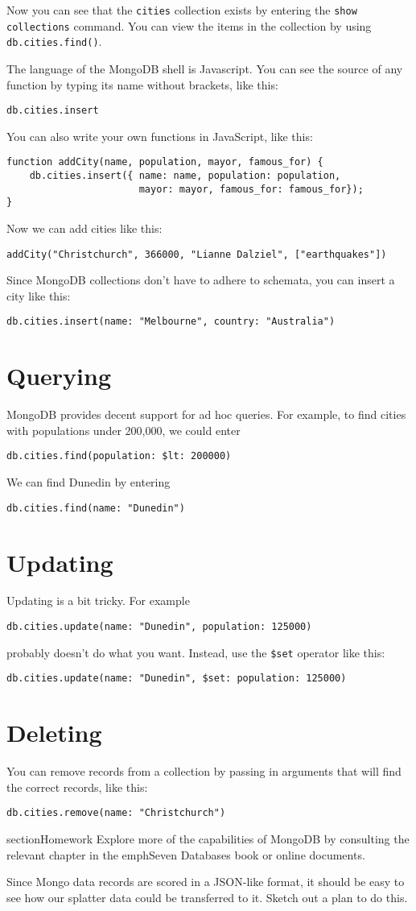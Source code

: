\documentclass{article}
\begin{document}
Now you can see that the \texttt{cities} collection exists by entering the \texttt{show collections} command.  You can view the items in the collection by using \texttt{db.cities.find()}.

The language of the MongoDB shell is Javascript.  You can see the source of any function by typing its name without brackets, like this:

\texttt{db.cities.insert}

You can also write your own functions in JavaScript, like this:

\begin{verbatim}
function addCity(name, population, mayor, famous_for) {
    db.cities.insert({ name: name, population: population, 
                       mayor: mayor, famous_for: famous_for});
}
\end{verbatim}

Now we can add cities like this:

\texttt{addCity("Christchurch", 366000, "Lianne Dalziel", ["earthquakes"]) }

Since MongoDB collections don't have to adhere to schemata, you can insert a
city like this:

\texttt{db.cities.insert({name: "Melbourne", country: "Australia"})}

\section{Querying}
MongoDB provides decent support for ad hoc queries.  For example, to find 
cities with populations under 200,000, we could enter

\texttt{db.cities.find({population: {\$lt: 200000}})}

We can find Dunedin by entering

\texttt{db.cities.find({name: "Dunedin"})}

\section{Updating}
Updating is a bit tricky.  For example


\texttt{db.cities.update({name: "Dunedin"}, {population: 125000})}

probably doesn't do what you want.  Instead, use the \texttt{\$set} operator like this:


\texttt{db.cities.update({name: "Dunedin"}, {\$set: {population: 125000}})}

\section{Deleting}
You can remove records from a collection by passing in arguments that will find the correct records, like this:

\texttt{db.cities.remove({name: "Christchurch"})}

section{Homework}
Explore more of the capabilities of MongoDB by consulting the relevant chapter in the emph{Seven Databases} book or online documents.

Since Mongo data records are scored in a JSON-like format, it should be easy to see how our splatter data could be transferred to it.  Sketch out a plan to do this.
\end{document}
